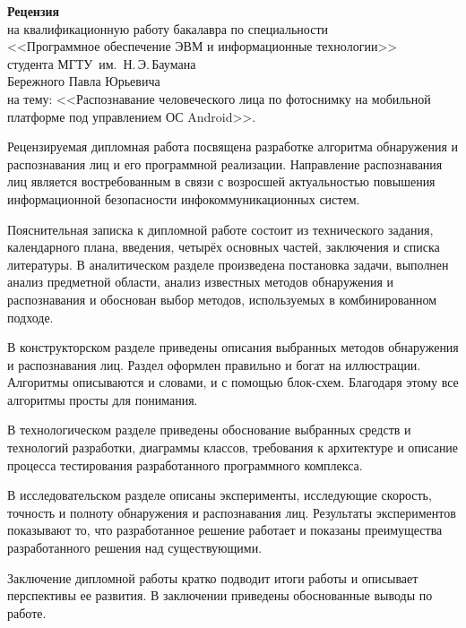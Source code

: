 \documentclass[a4paper]{article}
\begin{document}
\setlength{\parskip}{0.3cm}
\thispagestyle{empty}

\begin{center}
    \textbf{Рецензия} \\
    на квалификационную работу бакалавра по специальности \\
    <<Программное обеспечение ЭВМ и информационные технологии>> \\
    студента МГТУ~им.~Н.\,Э.\,Баумана \\
    Бережного Павла Юрьевича \\
    на тему: <<Распознавание человеческого лица по фотоснимку на мобильной \\
    платформе под управлением ОС Android>>.
\end{center}
\vspace{0.5cm}

Рецензируемая дипломная работа посвящена разработке алгоритма обнаружения и распознавания лиц и его программной реализации.
Направление распознавания лиц является востребованным в связи с возросшей актуальностью повышения информационной
безопасности инфокоммуникационных систем.

Пояснительная записка к дипломной работе состоит из технического задания, календарного плана, введения, четырёх основных
частей, заключения и списка литературы. В аналитическом разделе произведена постановка задачи, выполнен анализ предметной области,
анализ известных методов обнаружения и распознавания и обоснован выбор методов, используемых в комбинированном подходе.

В конструкторском разделе приведены описания выбранных методов обнаружения и распознавания лиц. Раздел оформлен правильно
и богат на иллюстрации. Алгоритмы описываются и словами, и с помощью блок-схем. Благодаря этому все алгоритмы просты для
понимания.

В технологическом разделе приведены обоснование выбранных средств и технологий разработки, диаграммы классов, требования к архитектуре и описание процесса
тестирования разработанного программного комплекса.

В исследовательском разделе описаны эксперименты, исследующие скорость, точность
и полноту обнаружения и распознавания лиц. Результаты экспериментов показывают то, что разработанное
решение работает и показаны преимущества разработанного решения над существующими.

Заключение дипломной работы кратко подводит итоги работы и описывает 
перспективы ее развития. В заключении приведены обоснованные выводы по работе. 
\end{document}
